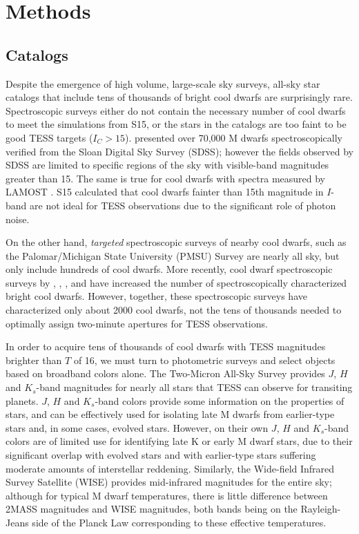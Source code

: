 \documentclass[twocolumn]{aastex62}
\begin{document}
\section{Methods}\label{sec:methods}


\subsection{Catalogs}

Despite the emergence of high volume, large-scale sky surveys, all-sky star catalogs that include tens of thousands of bright cool dwarfs are surprisingly rare.  Spectroscopic surveys either do not contain the necessary number of cool dwarfs to meet the simulations from S15, or the stars in the catalogs are too faint to be good TESS targets ($I_C>15$).  \citet{West2008} presented over 70,000 M dwarfs spectroscopically verified from the Sloan Digital Sky Survey (SDSS); however the fields observed by SDSS are limited to specific regions of the sky with visible-band magnitudes greater than 15.  The same is true for cool dwarfs with spectra measured by LAMOST \citep[][]{Yi2014}.  S15 calculated that cool dwarfs fainter than 15th magnitude in $I$-band are not ideal for TESS observations due to the significant role of photon noise.

On the other hand, {\it targeted} spectroscopic surveys of nearby cool dwarfs, such as the Palomar/Michigan State University (PMSU) Survey \citep[][]{Reid1995, Hawley1997, Gizis2002, Reid2002} are nearly all sky, but only include hundreds of cool dwarfs.  More recently,  cool dwarf spectroscopic surveys by \citet[][]{Rojas2012}, \citet[][]{Deshpande2013}, \citet{Newton2014},  \citet{Terrien2015} and \citet[][]{Zhong2015} have increased the number of spectroscopically characterized bright cool dwarfs.  However, together, these spectroscopic surveys have characterized only about 2000 cool dwarfs, not the tens of thousands needed to optimally assign two-minute apertures for TESS observations.

In order to acquire tens of thousands of cool dwarfs with TESS magnitudes brighter than $T$ of 16, we must turn to photometric surveys and select objects based on broadband colors alone.  The Two-Micron All-Sky Survey \citep[2MASS][]{Cutri2003, Skrutskie2006} provides $J$, $H$ and $K_s$-band magnitudes for nearly all stars that TESS can observe for transiting planets.  $J$, $H$ and $K_s$-band colors provide some information on the properties of stars, and can be effectively used for isolating late M dwarfs from earlier-type stars and, in some cases, evolved stars. However, on their own $J$, $H$ and $K_s$-band colors are of limited use for identifying late K or early M dwarf stars, due to their significant overlap with evolved stars \citep[see for example][their Figure 5]{Bessell1988} and with earlier-type stars suffering moderate amounts of interstellar reddening.  Similarly, the Wide-field Infrared Survey Satellite (WISE) provides mid-infrared magnitudes for the entire sky; although for typical M dwarf temperatures, there is little difference between 2MASS magnitudes and WISE magnitudes, both bands being on the Rayleigh-Jeans side of the Planck Law corresponding to these effective temperatures.
\end{document}
